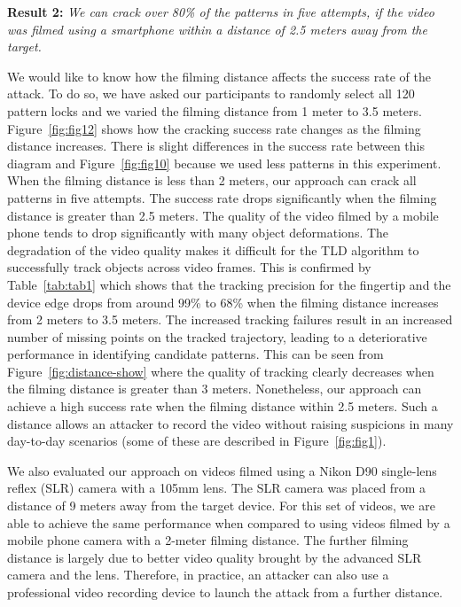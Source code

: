         \noindent \textbf{Result 2:} \emph{We can crack over 80\% of the patterns in five attempts, if the video was filmed using a smartphone within a distance of 2.5 meters away from the target.}

           We would like to know how the filming distance affects the
           success rate of the attack. To do so, we have asked our participants to randomly select all 120
           pattern locks and we varied the
           filming distance from 1 meter to 3.5 meters.
           Figure~\ref{fig:fig12} shows how the cracking success rate changes
           as the filming distance increases. There is slight differences in the success rate between this diagram and Figure~\ref{fig:fig10}
            because we used less patterns in this experiment.
           When the filming distance is less than 2 meters, our approach can crack all patterns in five attempts.
           The success rate drops significantly when
           the filming distance is greater than 2.5 meters.
           The quality of the video filmed by a mobile phone tends to drop significantly with many object deformations. The degradation of the video quality makes it difficult for the TLD algorithm to successfully track objects across video frames.
            This is confirmed by Table~\ref{tab:tab1}
           which shows that the tracking precision for the fingertip and the device edge drops from around 99\% to
           68\% when the filming
           distance increases from 2 meters to 3.5 meters. The increased
           tracking failures result in an increased number of missing
           points on the tracked trajectory, leading to a deteriorative performance in identifying candidate patterns.
           This can be seen from Figure~\ref{fig:distance-show} where the quality
           of tracking clearly decreases when the filming distance is greater
           than 3 meters.
           Nonetheless, our approach can
           achieve a high success rate when the filming distance within
           2.5 meters. Such a distance allows an attacker to
           record the video without raising suspicions in many day-to-day scenarios (some of these are
           described in Figure~\ref{fig:fig1}).

            We also evaluated our approach on videos filmed using a Nikon D90
            single-lens reflex (SLR) camera with a 105mm lens. The SLR camera
            was placed from a distance of 9 meters away from the target
            device. For this set of videos, we are able to achieve the same
            performance when compared to using videos filmed by a mobile
            phone camera with a 2-meter filming distance. The further filming
            distance is largely due to better video quality brought by the advanced
            SLR camera and the lens. Therefore, in practice, an attacker can
            also use a professional video recording device to launch the
            attack from a further distance.


